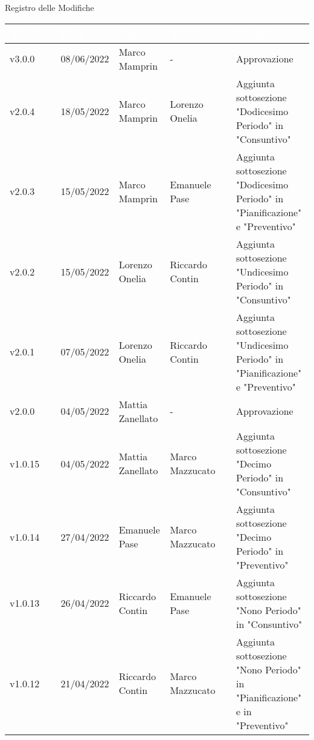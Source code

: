 \begin{center}
  \huge{Registro delle Modifiche}
\end{center}
\renewcommand\arraystretch{1,5}
{\centering
\begin{longtable}{|C{1.8cm}|C{2.1cm}|C{2cm}|C{2.4cm}|L{4.4cm}|}
  \hline
  \textcolor[HTML]{FFFFFF}{\textbf{Versione}} & \textcolor[HTML]{FFFFFF}{\textbf{Data}} & \textcolor[HTML]{FFFFFF}{\textbf{Autore}}  & \textcolor[HTML]{FFFFFF}{\textbf{Verificatore}} & \textcolor[HTML]{FFFFFF}{\textbf{Modifica}}    \\ \hline
  v3.0.0        & 08/06/2022    & Marco Mamprin   &  -  & Approvazione \\ \hline
  v2.0.4        & 18/05/2022    & Marco Mamprin   & Lorenzo Onelia  & Aggiunta sottosezione "Dodicesimo Periodo" in "Consuntivo" \\ \hline
  v2.0.3        & 15/05/2022    & Marco Mamprin   & Emanuele Pase  & Aggiunta sottosezione "Dodicesimo Periodo" in "Pianificazione" e "Preventivo" \\ \hline
  v2.0.2        & 15/05/2022    & Lorenzo Onelia   &  Riccardo Contin & Aggiunta sottosezione "Undicesimo Periodo" in "Consuntivo" \\ \hline
  v2.0.1        & 07/05/2022    & Lorenzo Onelia   &  Riccardo Contin  & Aggiunta sottosezione "Undicesimo Periodo" in "Pianificazione" e "Preventivo" \\ \hline
  v2.0.0        & 04/05/2022    & Mattia Zanellato   &  -  & Approvazione \\ \hline
  v1.0.15       & 04/05/2022    & Mattia Zanellato   &  Marco Mazzucato  & Aggiunta sottosezione "Decimo Periodo" in "Consuntivo" \\ \hline
  v1.0.14       & 27/04/2022    & Emanuele Pase   &   Marco Mazzucato & Aggiunta sottosezione "Decimo Periodo" in "Preventivo" \\ \hline
  v1.0.13       & 26/04/2022    & Riccardo Contin   &  Emanuele Pase  & Aggiunta sottosezione "Nono Periodo" in "Consuntivo" \\ \hline
  v1.0.12       & 21/04/2022    & Riccardo Contin   &  Marco Mazzucato   & Aggiunta sottosezione "Nono Periodo" in "Pianificazione" e in "Preventivo" \\ \hline

\end{longtable}}
